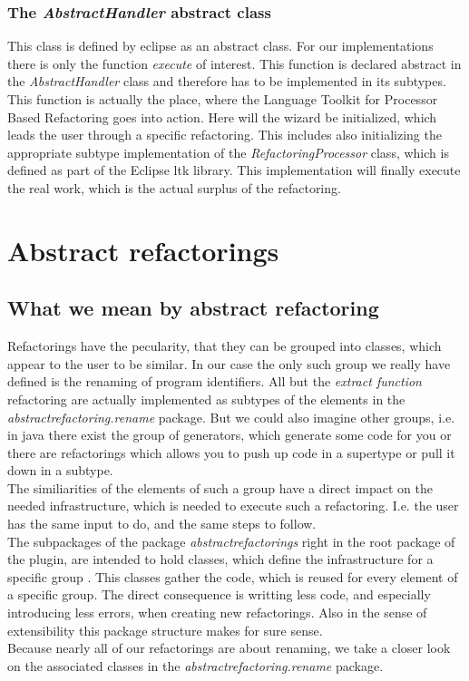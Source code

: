 \documentclass[a4paper,10pt]{report}
\begin{document}
\subsection{The {\it AbstractHandler} abstract class}
This class is defined by eclipse as an abstract class. For our implementations there is only the function {\it execute} of interest. This function is declared abstract in the {\it AbstractHandler} class and therefore has to be implemented in its subtypes.\\
This function is actually the place, where the Language Toolkit for Processor Based Refactoring goes into action. Here will the wizard be initialized, which leads the user through a specific refactoring. This includes also initializing the appropriate subtype implementation of the {\it RefactoringProcessor} class, which is defined as part of the Eclipse ltk library. 
This implementation will finally execute the real work, which is the actual surplus of the refactoring.

\chapter{Abstract refactorings}
\section{What we mean by abstract refactoring}
Refactorings have the pecularity, that they can be grouped into classes, which appear to the user to be similar. In our case the only such group we really have defined is the renaming of program identifiers. All but the {\it extract function} refactoring are actually implemented as subtypes of the elements in the {\it abstractrefactoring.rename} package.
But we could also imagine other groups, i.e. in java there exist the group of generators, which generate some code for you or there are refactorings which allows you to push up code in a supertype or pull it down in a subtype.\\
The similiarities of the elements of such a group have a direct impact on the needed infrastructure, which is needed to execute such a refactoring. I.e. the user has the same input to do, and the same steps to follow.\\
The subpackages of the package {\it abstractrefactorings} right in the root package of the plugin, are intended to hold classes, which define the infrastructure for a specific group . This classes gather the code, which is reused for every element of a specific group. The direct consequence is writting less code, and especially introducing less errors, when creating new refactorings. Also in the sense of extensibility this package structure makes for sure sense.\\
Because nearly all of our refactorings are about renaming, we take a closer look on the associated classes in the {\it abstractrefactoring.rename} package.
\end{document}
